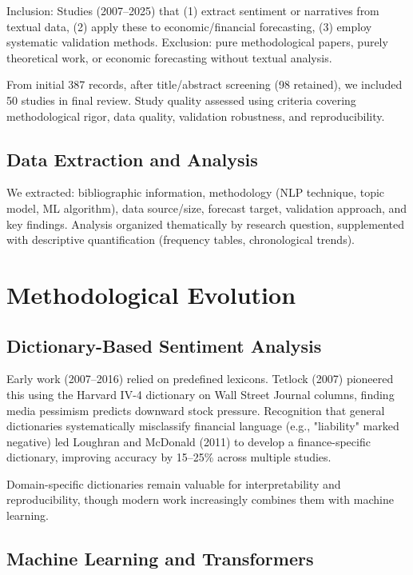 \documentclass[11pt]{article}
\begin{document}
Inclusion: Studies (2007--2025) that (1) extract sentiment or narratives from textual data, (2) apply these to economic/financial forecasting, (3) employ systematic validation methods. Exclusion: pure methodological papers, purely theoretical work, or economic forecasting without textual analysis.

From initial 387 records, after title/abstract screening (98 retained), we included 50 studies in final review. Study quality assessed using criteria covering methodological rigor, data quality, validation robustness, and reproducibility.

\subsection{Data Extraction and Analysis}

We extracted: bibliographic information, methodology (NLP technique, topic model, ML algorithm), data source/size, forecast target, validation approach, and key findings. Analysis organized thematically by research question, supplemented with descriptive quantification (frequency tables, chronological trends).

\section{Methodological Evolution}

\subsection{Dictionary-Based Sentiment Analysis}

Early work (2007--2016) relied on predefined lexicons. Tetlock (2007) pioneered this using the Harvard IV-4 dictionary on Wall Street Journal columns, finding media pessimism predicts downward stock pressure. Recognition that general dictionaries systematically misclassify financial language (e.g., "liability" marked negative) led Loughran and McDonald (2011) to develop a finance-specific dictionary, improving accuracy by 15--25\% across multiple studies.

Domain-specific dictionaries remain valuable for interpretability and reproducibility, though modern work increasingly combines them with machine learning.

\subsection{Machine Learning and Transformers}
\end{document}
